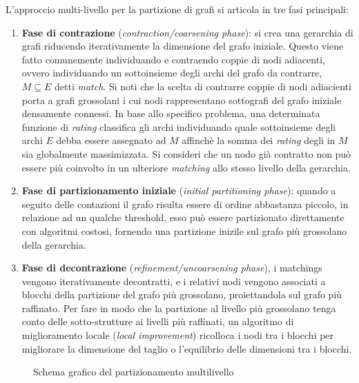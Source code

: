 L'approccio multi-livello per la partizione di grafi si articola in tre fasi principali:
\begin{enumerate}
    \item \textbf{Fase di contrazione} (\textit{contraction/coarsening phase}):
    si crea una gerarchia di grafi riducendo iterativamente la dimensione del grafo iniziale.
    Questo viene fatto comunemente individuando e contraendo coppie di nodi adiacenti, ovvero individuando un
    sottoinsieme degli archi del grafo da contrarre, $M \subseteq E $ detti \textit{match}.
    Si noti che la scelta di contrarre coppie di nodi adiacienti porta a grafi grossolani i cui nodi rappresentano
    sottografi del grafo iniziale densamente connessi.
    In base allo specifico problema, una determinata funzione di \textit{rating} classifica gli archi individuando
    quale sottoinsieme degli archi $E$ debba essere assegnato ad $M$ affinch\`e la somma dei \textit{rating} degli in
    $M$ sia globalmente massimizzata.
    Si consideri che un nodo gi\`a contratto non pu\`o essere pi\`u coinvolto in un ulteriore \textit{matching}
    allo stesso livello della gerarchia.
    \item \textbf{Fase di partizionamento iniziale} (\textit{initial partitioning phase}): quando a seguito delle
    contazioni il grafo risulta essere di ordine abbastanza piccolo, in relazione ad un qualche threshold,
    esso pu\`o essere partizionato direttamente con algoritmi costosi, fornendo una partizione inizile sul grafo
    pi\`u grossolano della gerarchia.
    \item \textbf{Fase di decontrazione} (\textit{refinement/uncoarsening phase}), i matchings vengono iterativamente
    decontratti, e i relativi nodi vengono associati a blocchi della partizione del grafo pi\`u grossolano,
    proiettandola sul grafo pi\`u raffinato.
    Per fare in modo che la partizione al livello pi\`u grossolano tenga conto delle sotto-strutture ai livelli
    pi\`u raffinati, un algoritmo di miglioramento locale (\textit{local improvement}) ricolloca i nodi tra i
    blocchi per migliorare la dimensione del taglio o l'equilibrio delle dimensioni tra i blocchi.
\end{enumerate}

\begin{figure}[h]
    \centering
    
    \caption{Schema grafico del partizionamento multilivello}
    \label{fig:multi-level-graph-partitioning}
\end{figure}






